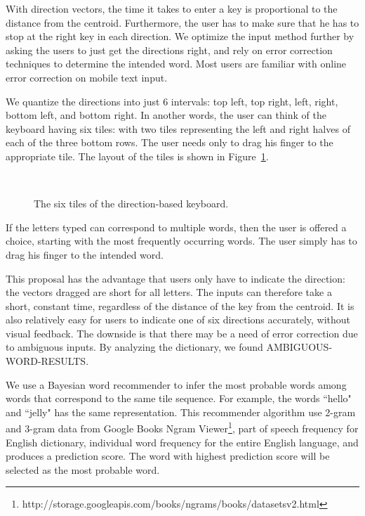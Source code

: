 With direction vectors, the time it takes to enter a key is proportional to the distance from the centroid.  Furthermore, the user has to make sure that he has to stop at the right key in each direction.  We optimize the input method further by asking the users to just get the directions right, and rely on error correction techniques to determine the intended word.  Most users are familiar with online error correction on mobile text input. 

We quantize the directions into just 6 intervals: top left, top right, left, right, bottom left, and bottom right.   In another words, the user can think of the keyboard having six tiles: with two tiles representing the left and right halves of each of the three bottom rows.  The user needs only to drag his finger to the appropriate tile.  The layout of the tiles is shown in Figure~\ref{fig:swipeVRLayout}.

\begin{figure}
  \centering

  
  \caption{The six tiles of the direction-based keyboard.}
  ~\label{fig:swipeVRLayout}
\end{figure}

If the letters typed can correspond to multiple words, then the user is offered a choice, starting with the most frequently occurring words.  The user simply has to drag his finger to the intended word. 

This proposal has the advantage that users only have to indicate the direction: the vectors dragged are short for all letters.  The inputs can therefore take a short, constant time, regardless of the distance of the key from the centroid.  It is also relatively easy for users to indicate one of six directions accurately, without visual feedback.  The downside is that there may be a need of error correction due to ambiguous inputs.  By analyzing the dictionary, we found AMBIGUOUS-WORD-RESULTS.

We use a Bayesian word recommender to infer the most probable words among words that correspond to the same tile sequence.  For example, the words ``hello" and ``jelly" has the same representation.  
This recommender algorithm use 2-gram and 3-gram data from Google Books Ngram Viewer\footnote{http://storage.googleapis.com/books/ngrams/books/datasetsv2.html}, part of speech frequency for English dictionary, individual word frequency for the entire English language, and produces a prediction score.
The word with highest prediction score will be selected as the most probable word.

